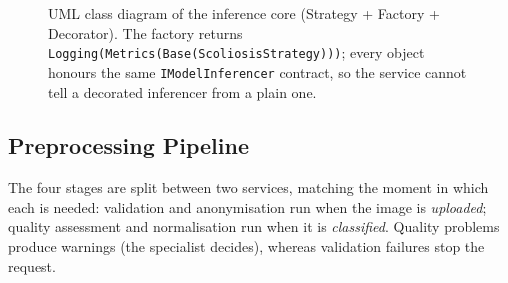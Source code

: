 \documentclass[12pt,a4paper]{article}
\newcommand{\fp}[1]{\nolinkurl{#1}}
\begin{document}
\begin{figure}[H]
{}
\caption{UML class diagram of the inference core (Strategy + Factory + Decorator). The factory returns
\fp{Logging(Metrics(Base(ScoliosisStrategy)))}; every object honours the same
\texttt{IModelInferencer} contract, so the service cannot tell a decorated inferencer from a plain one.}
\label{fig:classdiagram}
\end{figure}

\subsection{Preprocessing Pipeline}
\label{sec:pipeline}

The four stages are split between two services, matching the moment in which each is needed:
validation and anonymisation run when the image is \emph{uploaded}; quality assessment and
normalisation run when it is \emph{classified}. Quality problems produce warnings (the specialist
decides), whereas validation failures stop the request.
\end{document}
